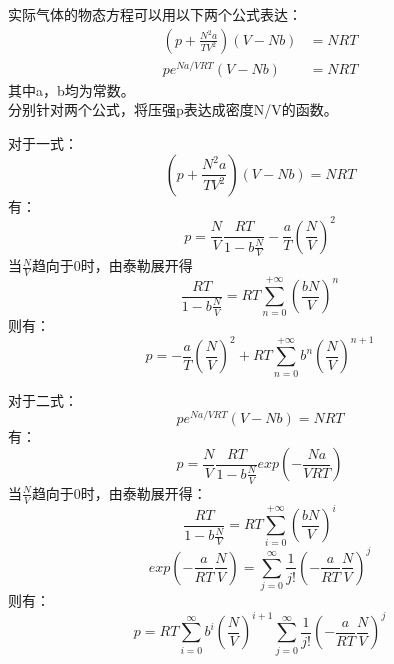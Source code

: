 \documentclass[a4paper,12pt]{article}
\begin{document}
\begin{section}{}
    实际气体的物态方程可以用以下两个公式表达：
    \begin{equation}\nonumber
        \begin{aligned}
            \left(p+\frac{N^2a}{TV^2}\right)\left(V-Nb\right)&=NRT\\
            pe^{Na/VRT}\left(V-Nb\right)&=NRT
        \end{aligned}
    \end{equation}
    其中a，b均为常数。\\
    分别针对两个公式，将压强p表达成密度N/V的函数。
    
    \begin{subsection}{}
        对于一式：
        \begin{equation}\nonumber
            \left(p+\frac{N^2a}{TV^2}\right)\left(V-Nb\right)=NRT
        \end{equation}
        有：
        \begin{equation}\nonumber
            p=\frac{N}{V}\frac{RT}{1-b\frac{N}{V}}-\frac{a}{T}\left(\frac{N}{V}\right)^2
        \end{equation}
        当$\frac{N}{V}$趋向于0时，由泰勒展开得
        \begin{equation}\nonumber
            \frac{RT}{1-b\frac{N}{V}}=RT\sum_{n=0}^{+\infty}\left(\frac{bN}{V}\right)^n
        \end{equation}
        则有：
        \begin{equation}\nonumber
            p=-\frac{a}{T}\left(\frac{N}{V}\right)^2+RT\sum_{n=0}^{+\infty}b^n\left(\frac{N}{V}\right)^{n+1}
        \end{equation}
    \end{subsection}

    \begin{subsection}{}
        对于二式：
        \begin{equation}\nonumber
            pe^{Na/VRT}\left(V-Nb\right)=NRT
        \end{equation}
        有：
        \begin{equation}\nonumber
            p=\frac{N}{V}\frac{RT}{1-b\frac{N}{V}}exp\left(-\frac{Na}{VRT}\right)
        \end{equation}
        当$\frac{N}{V}$趋向于0时，由泰勒展开得：
        \begin{equation}\nonumber
            \frac{RT}{1-b\frac{N}{V}}=RT\sum_{i=0}^{+\infty}\left(\frac{bN}{V}\right)^i
        \end{equation}
        \begin{equation}\nonumber
            exp\left(-\frac{a}{RT}\frac{N}{V}\right)=\sum_{j=0}^{\infty}\frac{1}{j!}\left(-\frac{a}{RT}\frac{N}{V}\right)^j
        \end{equation}
        则有：
        \begin{equation}\nonumber
            p=RT\sum_{i=0}^{\infty}b^i\left(\frac{N}{V}\right)^{i+1}\sum_{j=0}^{\infty}\frac{1}{j!}\left(-\frac{a}{RT}\frac{N}{V}\right)^j
        \end{equation}
    \end{subsection}
\end{section}
\end{document}
